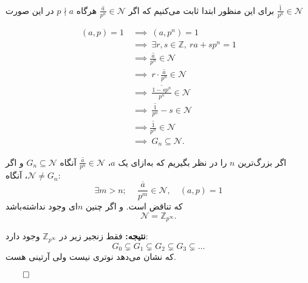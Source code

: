 \begin{frame}
    برای این منظور ابتدا ثابت می‌کنیم که اگر
    \(\overline{\frac{a}{p^n}} \in \mathcal{N}\)
    هرگاه
    \(p \nmid a\)
    در این صورت
    \(\overline{\frac{1}{p^n}} \in \mathcal{N}\)
    \begin{tblock}{}
        \[
            \begin{aligned}
                (a, p) = 1 \  & \implies\ (a, p^n) = 1 \                                   \\
                              & \implies\ \exists r, s \in \mathbb{Z}, \ ra + sp^n = 1     \\
                              & \implies \overline{\frac{a}{p^n}} \in \mathcal{N}          \\
                              & \implies\ r \cdot \overline{\frac{a}{p^n}} \in \mathcal{N} \\
                              & \implies\ \overline{\frac{1 - sp^n}{p^n}} \in \mathcal{N}  \\
                              & \implies\ \overline{\frac{1}{p^n}} - s \in \mathcal{N}     \\
                              & \implies \overline{\frac{1}{p^n}} \in \mathcal{N}          \\
                              & \implies\ G_n \subseteq \mathcal{N}.
            \end{aligned}
        \]

    \end{tblock}
\end{frame}


\begin{frame}

    اگر بزرگ‌ترین $n$ را در نظر بگیریم که به‌ازای یک ‌\(a\)، $\overline{\frac{a}{p^n}} \in \mathcal{N}$ آنگاه \(G_n \subseteq \mathcal{N}\) و اگر $\mathcal{N} \neq G_n$، آنگاه:
    \[
        \exists m > n; \quad \ \overline{\frac{a}{p^m}} \in \mathcal{N}, \quad (a, p) = 1
    \]
    که تناقض است.
    و اگر چنین
    \(n\)ای
    وجود نداشته‌باشد
    $$\mathcal{N} = \mathbb{Z}_{p^\infty}.$$

    \textbf{نتیجه:} فقط زنجیر زیر در $\mathbb{Z}_{p^\infty}$ وجود دارد:
    \[
        G_0 \subsetneq G_1 \subsetneq G_2 \subsetneq G_3 \subsetneq \dots
    \]
    که نشان می‌دهد نوتری نیست ولی آرتینی هست.

    \hfill\(\qed\)
\end{frame}

